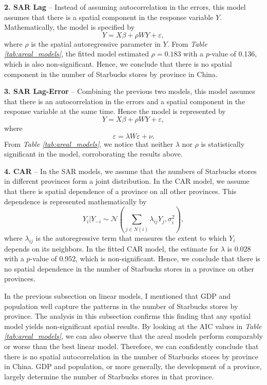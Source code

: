 \documentclass{article}
\begin{document}
\textbf{2. SAR Lag} -- Instead of assuming autocorrelation in the errors, this model assumes that there is a spatial component in the response variable \(Y\). Mathematically, the model is specified by
\[Y = X\beta + \rho W Y + \varepsilon,\]
where \(\rho\) is the spatial autoregressive parameter in \(Y\). From \textit{Table \ref{tab:areal_models}}, the fitted model estimated \(\rho=0.183\) with a \(p\)-value of 0.136, which is also non-significant. Hence, we conclude that there is no spatial component in the number of Starbucks stores by province in China.

\textbf{3. SAR Lag-Error} -- Combining the previous two models, this model assumes that there is an autocorrelation in the errors and a spatial component in the response variable at the same time. Hence the model is represented by
\[Y = X\beta + \rho W Y + \varepsilon,\]
where
\[\varepsilon = \lambda W \varepsilon + \nu.\]
From \textit{Table \ref{tab:areal_models}}, we notice that neither \(\lambda\) nor \(\rho\) is statistically significant in the model, corroborating the results above.

\textbf{4. CAR} -- In the SAR models, we assume that the numbers of Starbucks stores in different provinces form a joint distribution. In the CAR model, we assume that there is spatial dependence of a province on all other provinces. This dependence is represented mathematically by
\[Y_i|Y_{-i} \sim \mathcal{N}\left(\sum_{j\in N(i)} \lambda_{ij} Y_j, \sigma_i^2\right),\]
where \(\lambda_{ij}\) is the autoregressive term that measures the extent to which \(Y_i\) depends on its neighbors. In the fitted CAR model, the estimate for \(\lambda\) is 0.028 with a \(p\)-value of 0.952, which is non-significant. Hence, we conclude that there is no spatial dependence in the number of Starbucks stores in a province on other provinces.

In the previous subsection on linear models, I mentioned that GDP and population well capture the patterns in the number of Starbucks stores by province. The analysis in this subsection confirms this finding that any spatial model yields non-significant spatial results. By looking at the AIC values in \textit{Table \ref{tab:areal_models}}, we can also observe that the areal models perform comparably or worse than the best linear model. Therefore, we can confidently conclude that there is no spatial autocorrelation in the number of Starbucks stores by province in China. GDP and population, or more generally, the development of a province, largely determine the number of Starbucks stores in that province.
\end{document}
